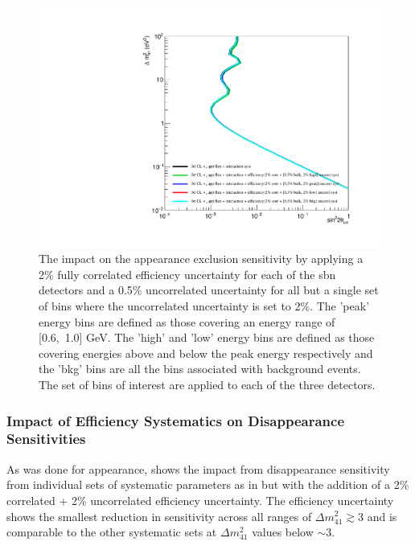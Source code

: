 \begin{figure}[h!]
    \centering
    \includegraphics[width = \largefigwidth]{figures-chap6/exclusion_contours/efficiency_systematics/nue_app_2pct_cor_05pct_bulk_2pct_X_uncor.pdf}
    \caption[\nue disapp with poorly constrained efficiency systematic for a set of bins.]{The impact on the \nue appearance exclusion sensitivity by applying a 2\% fully correlated efficiency uncertainty for each of the \gls{sbn} detectors and a 0.5\% uncorrelated uncertainty for all but a single set of bins where the uncorrelated uncertainty is set to 2\%. The 'peak' energy bins are defined as those covering an energy range of [0.6,~1.0] GeV. The 'high' and 'low' energy bins are defined as those covering energies above and below the peak energy respectively and the 'bkg' bins are all the bins associated with background events. The set of bins of interest are applied to each of the three detectors.}
    \label{fig:nue_app_bulk_uncertainty}
\end{figure}



\clearpage

\subsubsection*{\texorpdfstring{Impact of Efficiency Systematics on \nue Disappearance Sensitivities}{Impact of Efficiency Systematics on nue Disappearance Sensitivities}}

As was done for \nue appearance,  shows the impact from \nue disappearance sensitivity from individual sets of systematic parameters as in  but with the addition of a 2\% correlated + 2\% uncorrelated efficiency uncertainty. The efficiency uncertainty shows the smallest reduction in sensitivity across all ranges of $\Delta m_{41}^2 \gtrsim 3$ and is comparable to the other systematic sets at $\Delta m_{41}^2$ values below $\sim 3$.

